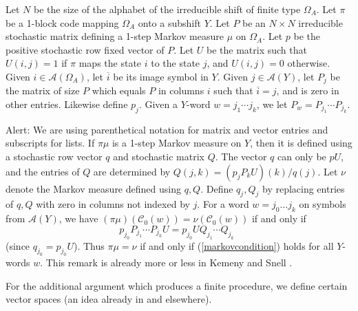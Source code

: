 \documentclass{kepart2010}
\theoremstyle{plain}
\theoremstyle{definition}
\theoremstyle{remark}
\theoremstyle{definition}
\numberwithin{equation}{section}
\begin{document}
Let $N$ be the size of the alphabet of the irreducible shift of
finite type $\Omega_A$. Let $\pi$ be a 1-block code mapping
$\Omega_A$ onto a subshift $Y$. Let $P$ be an $N\times N$
irreducible stochastic matrix defining a 1-step Markov measure $\mu$
on $\Omega_A$. Let $p$ be the positive stochastic row
fixed  vector of $P$. Let $U$ be the matrix such
that $U(i,j)=1$ if $\pi$ maps the state $i$ to the state $j$, and
$U(i,j)=0$ otherwise. Given $i\in \mathcal A(\Omega_A)$, let
$\overline i$ be its image symbol in $Y$. Given  $j\in \mathcal
A(Y)$, let $P_j$ be the matrix of size $P$ which equals $P$  in
columns $i$ such that $\overline i = j$, and is zero in other
entries. Likewise define $p_j$.
{Given a $Y$-word $w=j_1\cdots j_k$, we let $P_w=P_{j_1}\cdots
P_{j_k}$.}

{ Alert: We are using parenthetical notation for matrix and vector
entries and subscripts for lists.}
 If $\pi
\mu$ is a 1-step Markov measure on $Y$, then it is defined
using a stochastic row vector $q$ and stochastic matrix $Q$. The
vector $q$ can only be $pU$, and the entries of $Q$ are determined
by $Q(j,k) =(p_jP_{k}U)(k)/q(j)$.
 Let $\nu$ denote the Markov
measure defined using $q,Q$. Define $q_j, Q_j$ by replacing entries
of $q,Q$ with zero in columns not indexed by $j$. For a word
$w=j_0\dots j_k$ on symbols from $\mathcal A(Y)$, we have $ (\pi
\mu) (\mathcal C_0(w)) = \nu (\mathcal C_0(w)) $ if and only if \begin{equation}
\label{markovcondition} p_{j_0}P_{j_1}\cdots P_{j_k}U = p_{j_0}U
Q_{j_1}\cdots Q_{j_k} \ \ \end{equation} (since $q_{j_0}=p_{j_0}U $). Thus
$\pi \mu = \nu$ if and only if (\ref{markovcondition})
 holds for all $Y$-words
 $w$.
This remark is already more or less in
Kemeny and Snell \cite[Theorem
6.4.1]{KemenySnell1960}.

For the additional argument which produces a finite procedure, we
define certain vector spaces (an idea already in
 \cite{Ellis,Kitchens1982,RubinoSericola1989,RubinoSericola1991,
GurvitsLedoux2005} and elsewhere).
\end{document}
